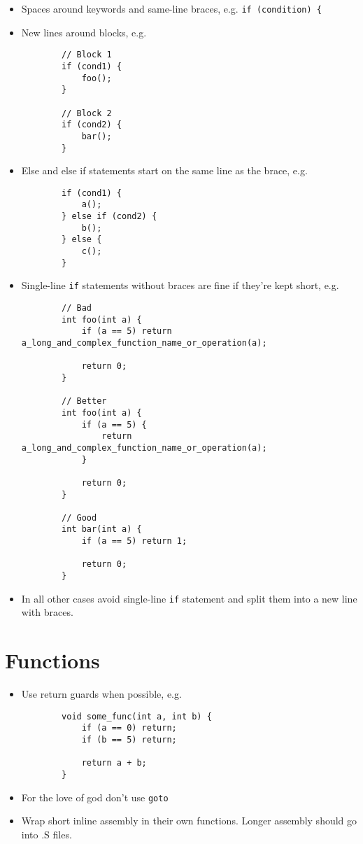 \documentclass{article}
\begin{document}
\begin{itemize}
	\item Spaces around keywords and same-line braces, e.g. \lstinline{if (condition) { }
	\item New lines around blocks, e.g.
	\begin{lstlisting}
		// Block 1
		if (cond1) {
			foo();
		}

		// Block 2
		if (cond2) {
			bar();
		}
	\end{lstlisting}

	\item Else and else if statements start on the same line as the brace, e.g.
	\begin{lstlisting}
		if (cond1) {
			a();
		} else if (cond2) {
			b();
		} else {
			c();
		}
	\end{lstlisting}

	\item Single-line \lstinline{if} statements without braces are fine if they're kept short, e.g.
	
	\begin{lstlisting}
		// Bad
		int foo(int a) {
			if (a == 5) return a_long_and_complex_function_name_or_operation(a);

			return 0;
		}

		// Better
		int foo(int a) {
			if (a == 5) {
				return a_long_and_complex_function_name_or_operation(a);
			}

			return 0;
		}

		// Good
		int bar(int a) {
			if (a == 5) return 1;

			return 0;
		}
	\end{lstlisting}

	\item In all other cases avoid single-line \lstinline{if} statement and split them into a new line with braces.
\end{itemize}

\section{Functions}
\begin{itemize}
	\item Use return guards when possible, e.g.
	\begin{lstlisting}
		void some_func(int a, int b) {
			if (a == 0) return;
			if (b == 5) return;

			return a + b;
		}
	\end{lstlisting}

	\item For the love of god don't use \lstinline{goto}
	\item Wrap short inline assembly in their own functions. Longer assembly should go into .S files.
\end{itemize}
\end{document}

